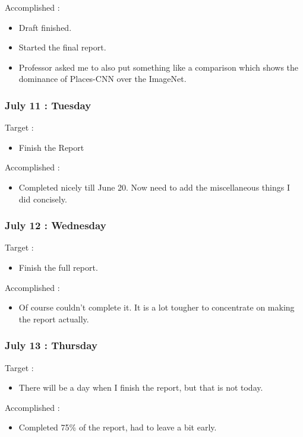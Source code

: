 \documentclass{article}
\begin{document}
Accomplished :
\begin{itemize}
\item Draft finished.
\item Started the final report.
\item Professor asked me to also put something like a comparison which shows the dominance of Places-CNN over the ImageNet.
\end{itemize}

\subsubsection{July 11 : Tuesday}
Target :
\begin{itemize}
\item Finish the Report
\end{itemize}

Accomplished :
\begin{itemize}
\item Completed nicely till June 20. Now need to add the miscellaneous things I did concisely.
\end{itemize}

\subsubsection{July 12 : Wednesday}
Target :
\begin{itemize}
\item Finish the full report.
\end{itemize}

Accomplished :
\begin{itemize}
\item Of course couldn't complete it. It is a lot tougher to concentrate on making the report actually.
\end{itemize}

\subsubsection{July 13 : Thursday}
Target :
\begin{itemize}
\item There will be a day when I finish the report, but that is not today.
\end{itemize}

Accomplished :
\begin{itemize}
\item Completed 75\% of the report, had to leave a bit early.
\end{itemize}
\end{document}
